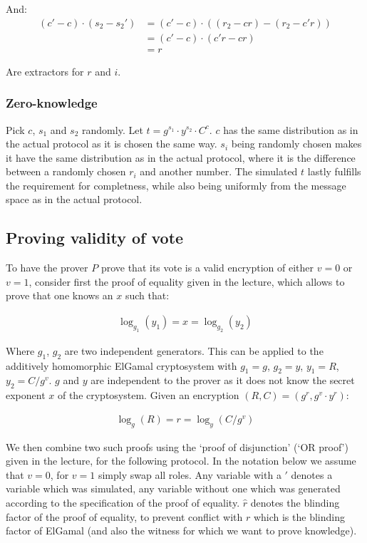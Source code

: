 \documentclass[a4paper]{scrreprt}
\begin{document}
And:
\begin{align*}
  (c' - c) \cdot (s_2 - s_2') & = (c' - c) \cdot ((r_2 - cr) - (r_2 - c' r)) \\
                              & = (c' - c) \cdot (c' r - cr) \\
                              & = r
\end{align*}

Are extractors for $r$ and $i$.

\subsubsection{Zero-knowledge}

Pick $c$, $s_1$ and $s_2$ randomly. Let $t = g^{s_1} \cdot y^{s_2} \cdot C^c$.
$c$ has the same distribution as in the actual protocol as it is chosen the
same way. $s_i$ being randomly chosen makes it have the same distribution as in
the actual protocol, where it is the difference between a randomly chosen $r_i$
and another number. The simulated $t$ lastly fulfills the requirement for
completness, while also being uniformly from the message space as in the actual
protocol.

\subsection{Proving validity of vote}

To have the prover $P$ prove that its vote is a valid encryption of either $v =
0$ or $v = 1$, consider first the proof of equality given in the lecture, which
allows to prove that one knows an $x$ such that:

\begin{align*}
  \log_{g_1}(y_1) = x = \log_{g_2}(y_2)
\end{align*}

Where $g_1$, $g_2$ are two independent generators. This can be applied to the
additively homomorphic ElGamal cryptosystem with $g_1 = g$, $g_2 = y$, $y_1 =
R$, $y_2 = C / g^v$. $g$ and $y$ are independent to the prover as it does not
know the secret exponent $x$ of the cryptosystem. Given an encryption $(R, C) =
(g^r, g^v \cdot y^r)$:

\begin{align*}
  \log_{g}(R) = r = \log_{y}(C / g^v)
\end{align*}

We then combine two such proofs using the `proof of disjunction' (`OR proof')
given in the lecture, for the following protocol. In the notation below we
assume that $v = 0$, for $v = 1$ simply swap all roles. Any variable with a $'$
denotes a variable which was simulated, any variable without one which was
generated according to the specification of the proof of equality. $\hat{r}$
denotes the blinding factor of the proof of equality, to prevent conflict with
$r$ which is the blinding factor of ElGamal (and also the witness for which we
want to prove knowledge).
\end{document}
